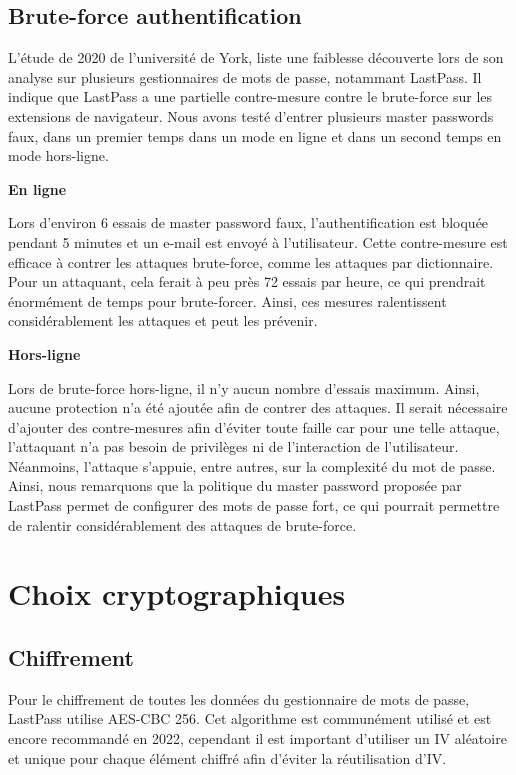 \subsection{Brute-force authentification}

L'étude de 2020 de l'université de York\cite{carr}, liste une faiblesse découverte lors de son analyse sur plusieurs gestionnaires de mots de passe, notammant LastPass. Il indique que LastPass a une partielle contre-mesure contre le brute-force sur les extensions de navigateur. Nous avons testé d'entrer plusieurs master passwords faux, dans un premier temps dans un mode en ligne et dans un second temps en mode hors-ligne.

\textbf{En ligne}

Lors d'environ 6 essais de master password faux, l'authentification est bloquée pendant 5 minutes et un e-mail est envoyé à l'utilisateur. Cette contre-mesure est efficace à contrer les attaques brute-force, comme les attaques par dictionnaire. Pour un attaquant, cela ferait à peu près 72 essais par heure, ce qui prendrait énormément de temps pour brute-forcer. Ainsi, ces mesures ralentissent considérablement les attaques et peut les prévenir. 

\textbf{Hors-ligne}

Lors de brute-force hors-ligne, il n'y aucun nombre d'essais maximum. Ainsi, aucune protection n'a été ajoutée afin de contrer des attaques. Il serait nécessaire d'ajouter des contre-mesures afin d'éviter toute faille car pour une telle attaque, l'attaquant n'a pas besoin de privilèges ni de l'interaction de l'utilisateur. Néanmoins, l'attaque s'appuie, entre autres, sur la complexité du mot de passe. Ainsi, nous remarquons que la politique du master password proposée par LastPass permet de configurer des mots de passe fort, ce qui pourrait permettre de ralentir considérablement des attaques de brute-force.

\section{Choix cryptographiques}
\subsection{Chiffrement}
Pour le chiffrement de toutes les données du gestionnaire de mots de passe, LastPass utilise AES-CBC 256. Cet algorithme est communément utilisé et est encore recommandé en 2022\cite{ecrypt}, cependant il est important d'utiliser un IV aléatoire et unique pour chaque élément chiffré afin d'éviter la réutilisation d'IV. 
